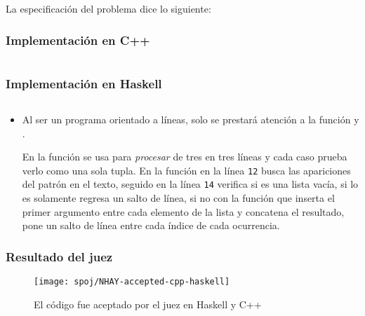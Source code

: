 \begin{itemize}
\end{itemize} 

La especificación del problema dice lo siguiente:


\subsubsection{Implementación en C++}
\inputminted[linenos, frame=lines, fontsize=\footnotesize]{cpp}{problemas/cpp/NHAY.cpp}

\subsubsection{Implementación en Haskell}
\inputminted[linenos, frame=lines]{haskell}{problemas/haskell/NHAY.hs}

\newpage
\begin{itemize}
\item Al ser un programa orientado a líneas, solo se prestará atención a la función
 y .

En la función  se usa para \textit{procesar} de tres en tres líneas y cada caso
prueba verlo como una sola tupla. En la función  en la línea \texttt{12} busca
las apariciones del patrón en el texto, seguido en la línea \texttt{14} verifica si es una lista
vacía, si lo es solamente regresa un salto de línea, si no con la función
 que inserta el primer argumento entre cada elemento
de la lista y concatena el resultado, pone un salto de línea entre cada índice de cada ocurrencia.
\end{itemize}

\subsubsection{Resultado del juez}
\begin{figure}[h]
\centering
\texttt{[image: spoj/NHAY-accepted-cpp-haskell]}
\caption{El código fue aceptado por el juez en Haskell y C++}
\end{figure}




